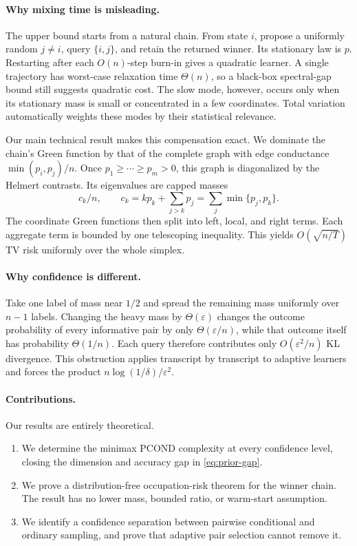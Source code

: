 \documentclass[twoside]{article}
\begin{document}
\paragraph{Why mixing time is misleading.}
The upper bound starts from a natural chain. From state $i$, propose a uniformly random $j\ne i$, query $\{i,j\}$, and retain the returned winner. Its stationary law is $p$. Restarting after each $O(n)$-step burn-in gives a quadratic learner. A single trajectory has worst-case relaxation time $\Theta(n)$, so a black-box spectral-gap bound still suggests quadratic cost. The slow mode, however, occurs only when its stationary mass is small or concentrated in a few coordinates. Total variation automatically weights these modes by their statistical relevance.

Our main technical result makes this compensation exact. We dominate the chain's Green function by that of the complete graph with edge conductance $\min(p_i,p_j)/n$. Once $p_1\ge\cdots\ge p_m>0$, this graph is diagonalized by the Helmert contrasts. Its eigenvalues are capped masses \[ c_k/n,\qquad c_k=kp_k+\sum_{j>k}p_j =\sum_j\min\{p_j,p_k\}. \] The coordinate Green functions then split into left, local, and right terms. Each aggregate term is bounded by one telescoping inequality. This yields $O(\sqrt{n/T})$ TV risk uniformly over the whole simplex.

\paragraph{Why confidence is different.}
Take one label of mass near $1/2$ and spread the remaining mass uniformly over $n-1$ labels. Changing the heavy mass by $\Theta(\varepsilon)$ changes the outcome probability of every informative pair by only $\Theta(\varepsilon/n)$, while that outcome itself has probability $\Theta(1/n)$. Each query therefore contributes only $O(\varepsilon^2/n)$ KL divergence. This obstruction applies transcript by transcript to adaptive learners and forces the product $n\log(1/\delta)/\varepsilon^2$.

\paragraph{Contributions.}
Our results are entirely theoretical.
\begin{enumerate}
\item We determine the minimax PCOND complexity at every confidence level,
closing the dimension and accuracy gap in \eqref{eq:prior-gap}.
\item We prove a distribution-free occupation-risk theorem for the winner
chain. The result has no lower mass, bounded ratio, or warm-start assumption.
\item We identify a confidence separation between pairwise conditional and
ordinary sampling, and prove that adaptive pair selection cannot remove it.
\end{enumerate}
\end{document}
